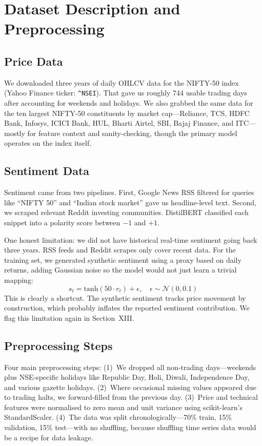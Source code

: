 \documentclass[conference]{IEEEtran}
\begin{document}
\section{Dataset Description and Preprocessing}

\subsection{Price Data}
We downloaded three years of daily OHLCV data for the NIFTY-50 index (Yahoo Finance ticker: \texttt{\^{}NSEI}). That gave us roughly 744 usable trading days after accounting for weekends and holidays. We also grabbed the same data for the ten largest NIFTY-50 constituents by market cap---Reliance, TCS, HDFC Bank, Infosys, ICICI Bank, HUL, Bharti Airtel, SBI, Bajaj Finance, and ITC---mostly for feature context and sanity-checking, though the primary model operates on the index itself.

\subsection{Sentiment Data}
Sentiment came from two pipelines. First, Google News RSS filtered for queries like ``NIFTY 50'' and ``Indian stock market'' gave us headline-level text. Second, we scraped relevant Reddit investing communities. DistilBERT classified each snippet into a polarity score between $-1$ and $+1$.

One honest limitation: we did not have historical real-time sentiment going back three years. RSS feeds and Reddit scrapes only cover recent data. For the training set, we generated synthetic sentiment using a proxy based on daily returns, adding Gaussian noise so the model would not just learn a trivial mapping:
\begin{equation}
s_t = \text{tanh}(50 \cdot r_t) + \epsilon, \quad \epsilon \sim \mathcal{N}(0, 0.1)
\end{equation}
This is clearly a shortcut. The synthetic sentiment tracks price movement by construction, which probably inflates the reported sentiment contribution. We flag this limitation again in Section~XIII.

\subsection{Preprocessing Steps}
Four main preprocessing steps: (1)~We dropped all non-trading days---weekends plus NSE-specific holidays like Republic Day, Holi, Diwali, Independence Day, and various gazette holidays. (2)~Where occasional missing values appeared due to trading halts, we forward-filled from the previous day. (3)~Price and technical features were normalised to zero mean and unit variance using scikit-learn's StandardScaler. (4)~The data was split chronologically---70\% train, 15\% validation, 15\% test---with no shuffling, because shuffling time series data would be a recipe for data leakage.
\end{document}
